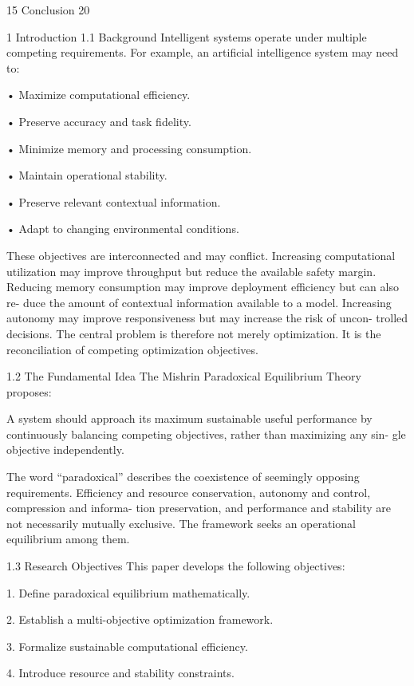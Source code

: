 \documentclass[10pt,a4paper]{article}
\begin{document}
\begin{ManuscriptText}
15 Conclusion                                                                               20


1     Introduction
1.1     Background
Intelligent systems operate under multiple competing requirements.
    For example, an artificial intelligence system may need to:

    • Maximize computational efficiency.

    • Preserve accuracy and task fidelity.

    • Minimize memory and processing consumption.

    • Maintain operational stability.

    • Preserve relevant contextual information.

    • Adapt to changing environmental conditions.

    These objectives are interconnected and may conflict.
    Increasing computational utilization may improve throughput but reduce the available
safety margin.
    Reducing memory consumption may improve deployment efficiency but can also re-
duce the amount of contextual information available to a model.
    Increasing autonomy may improve responsiveness but may increase the risk of uncon-
trolled decisions.
    The central problem is therefore not merely optimization. It is the reconciliation of
competing optimization objectives.


1.2     The Fundamental Idea
The Mishrin Paradoxical Equilibrium Theory proposes:

      A system should approach its maximum sustainable useful performance by
      continuously balancing competing objectives, rather than maximizing any sin-
      gle objective independently.

    The word “paradoxical” describes the coexistence of seemingly opposing requirements.
    Efficiency and resource conservation, autonomy and control, compression and informa-
tion preservation, and performance and stability are not necessarily mutually exclusive.
    The framework seeks an operational equilibrium among them.


1.3     Research Objectives
This paper develops the following objectives:

    1. Define paradoxical equilibrium mathematically.

    2. Establish a multi-objective optimization framework.

    3. Formalize sustainable computational efficiency.

    4. Introduce resource and stability constraints.


\end{ManuscriptText}
\end{document}
